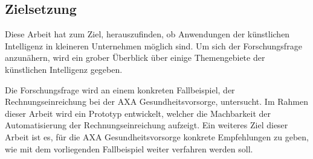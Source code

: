 




\subsection{Zielsetzung}

Diese Arbeit hat zum Ziel, herauszufinden, ob Anwendungen der künstlichen Intelligenz in kleineren Unternehmen möglich sind. Um sich der Forschungsfrage anzunähern, wird ein grober Überblick über einige Themengebiete der künstlichen Intelligenz gegeben. 

Die Forschungsfrage wird an einem konkreten Fallbeispiel, der Rechnungseinreichung bei der AXA Gesundheitsvorsorge, untersucht. Im Rahmen dieser Arbeit wird ein Prototyp entwickelt, welcher die Machbarkeit der Automatisierung der Rechnungseinreichung aufzeigt. Ein weiteres Ziel dieser Arbeit ist es, für die AXA Gesundheitsvorsorge konkrete Empfehlungen zu geben, wie mit dem vorliegenden Fallbeispiel weiter verfahren werden soll.



